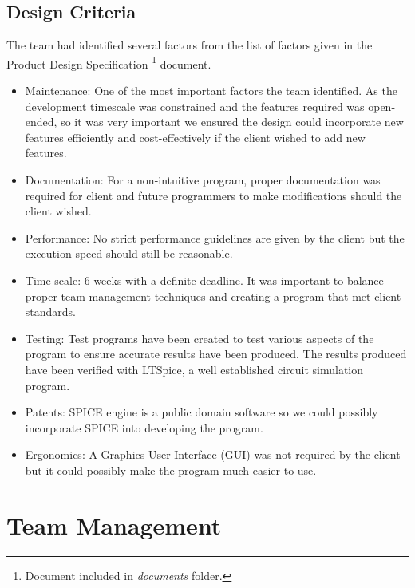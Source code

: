 \documentclass[12pt,a4paper]{article}
\begin{document}
	\subsection{Design Criteria}
	The team had identified several factors from the list of factors given in the Product Design Specification
	\footnote{Document included in \textit{documents} folder.} document.
	\begin{itemize}
		\item Maintenance: One of the most important factors the team identified. As the development timescale was 
		constrained and the features required was open-ended, so it was very important we ensured the design could 
		incorporate new features efficiently and cost-effectively if the client wished to add new features.
		\item Documentation: For a non-intuitive program, proper documentation was required for client and future
		programmers to make modifications should the client wished.
		\item Performance: No strict performance guidelines are given by the client but the execution 
		speed should still be reasonable. 
		\item Time scale: 6 weeks with a definite deadline. It was important to balance proper team management
		techniques and creating a program that met client standards.
		\item Testing: Test programs have been created to test various aspects of the program to ensure
		accurate results have been produced. The results produced have been verified with LTSpice, a well
		established circuit simulation program.
		\item Patents: SPICE engine is a public domain software so we could possibly incorporate SPICE into 
		developing the program.
		\item Ergonomics: A Graphics User Interface (GUI) was not required by the client but it could possibly 
		make the program much easier to use.
	\end{itemize}
	\vfill
	\pagebreak

\section{Team Management}
\end{document}
